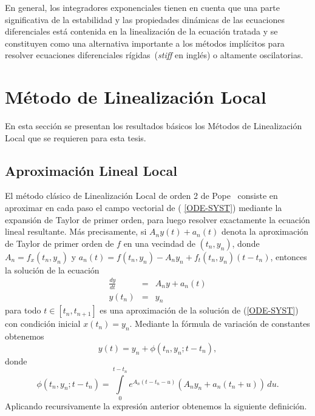 En general, los integradores exponenciales tienen en cuenta que una parte significativa de la estabilidad y las propiedades dinámicas de las ecuaciones diferenciales está contenida en la linealización de la ecuación tratada y se constituyen como una alternativa importante a los métodos implícitos para resolver ecuaciones diferenciales rígidas~(\textit{stiff} en inglés) o altamente oscilatorias.  


\section{Método de Linealización Local}\label{section:ll-methods}
En esta sección se presentan los resultados básicos los Métodos de Linealización Local que se requieren para esta tesis.

\subsection{Aproximación Lineal Local}

El método clásico de Linealización Local de orden 2 de Pope~\cite{pope1963exponential}
 consiste en aproximar en cada paso el campo vectorial de (%
\ref{ODE-SYST}) mediante la expansión de Taylor de primer orden, para
luego resolver exactamente la ecuación lineal resultante. Más
precisamente, si $A_{n}y(t)+a_{n}(t)$ denota la aproximación de Taylor
de primer orden de $f$ en una vecindad de $(t_n,y_{n})$, donde \mbox{$
	A_{n}=f_{x}(t_n,y_{n})$} y $a_{n}(t)=f(t_n,y_{n})-A_{n}y_{n}+f_t(t_n,y_n)(t-t_n)$, entonces la
solución de la ecuación 
\begin{eqnarray}
\frac{dy}{dt} & = & A_{n}y+a_{n}(t) \label{ODE-SYST-LINEAL-1} \\
y(t_{n})& = & y_{n}  \nonumber
\end{eqnarray}
para todo $t\in[t_{n},t_{n+1}]$ es una aproximación de la solución
de (\ref{ODE-SYST}) con condición inicial \mbox{$x(t_{n})=y_{n}$}. Mediante la fórmula de variación de constantes obtenemos 
\begin{equation*}
y(t)=y_{n}+\phi(t_{n},y_{n};t-t_{n}),  %
\end{equation*}
donde 
\begin{equation}
\phi(t_{n},y_{n};t-t_{n})=\int\limits^{t-t_{n}}_{0} e^{{A_{n}(t-t_{n}-u)}}
(A_{n}y_{n}+a_{n}(t_{n}+u))\,du.  \label{REV-PHI-DEF-2}
\end{equation}
Aplicando recursivamente la expresión anterior obtenemos la siguiente
definición.

